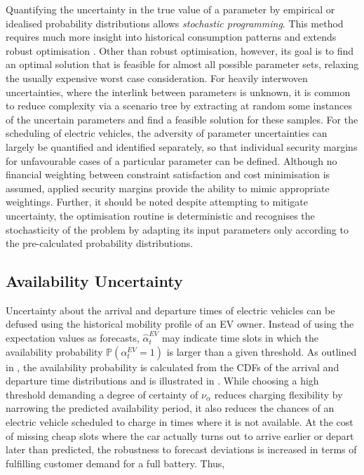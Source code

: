 Quantifying the uncertainty in the true value of a parameter by empirical or idealised probability distributions allows \textit{stochastic programming}. This method requires much more insight into historical consumption patterns and extends robust optimisation \cite{Sim2017}. Other than robust optimisation, however, its goal is to find an optimal solution that is feasible for almost all possible parameter sets, relaxing the usually expensive worst case consideration. For heavily interwoven uncertainties, where the interlink between parameters is unknown, it is common to reduce complexity via a scenario tree by extracting at random some instances of the uncertain parameters and find a feasible solution for these samples. For the scheduling of electric vehicles, the adversity of parameter uncertainties can largely be quantified and identified separately, so that individual security margins for unfavourable cases of a particular parameter can be defined. Although no financial weighting between constraint satisfaction and cost minimisation is assumed, applied security margins provide the ability to mimic appropriate weightings. Further, it should be noted despite attempting to mitigate uncertainty, the optimisation routine is deterministic and recognises the stochasticity of the problem by adapting its input parameters only according to the pre-calculated probability distributions.


\subsection{Availability Uncertainty}
\label{sec:av_unc}

Uncertainty about the arrival and departure times of electric vehicles can be defused using the historical mobility profile of an EV owner. Instead of using the expectation values as forecasts, $\hat{\alpha}^{EV}_{t}$ may indicate time slots in which the availability probability $\mathbb{P}\left(\alpha_t^{EV}=1\right)$ is larger than a given threshold. As outlined in , the availability probability is calculated from the CDFs of the arrival and departure time distributions and is illustrated in . While choosing a high threshold demanding a degree of certainty of $\nu_{\alpha}$ reduces charging flexibility by narrowing the predicted availability period, it also reduces the chances of an electric vehicle scheduled to charge in times where it is not available. At the cost of missing cheap slots where the car actually turns out to arrive earlier or depart later than predicted, the robustness to forecast deviations is increased in terms of fulfilling customer demand for a full battery. Thus,

